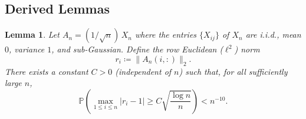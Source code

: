 \documentclass[11pt,a4paper]{article}
\newtheorem{lemma}[theorem]{Lemma}
\newcommand{\Prob}{\mathbb{P}}
\begin{document}
\subsection{Derived Lemmas}
\begin{lemma}\label{lem:row-col-conc}
Let $A_n=(1/\sqrt n)\,X_n$ where the entries $\{X_{ij}\}$ of $X_n$ are i.i.d., mean $0$, variance $1$, and sub-Gaussian. Define the row Euclidean ($\ell^2$) norm
\begin{equation}
r_i\coloneq \|A_n(i,:)\|_2.
\end{equation}
There exists a constant $C>0$ (independent of $n$) such that, for all sufficiently large $n$,
\begin{equation}\label{eq:row-col-conc}
\Prob\!\left(\max_{1\le i\le n}\big|r_i-1\big|\geq C\sqrt{\frac{\log n}{n}}\right)< n^{-10}.
\end{equation}
\end{lemma}
\end{document}
